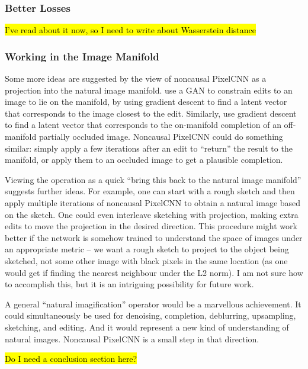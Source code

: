 \documentclass[10pt,a4paper]{article}
\newcommand{\nquote}[1]{``{#1}''}
\begin{document}
\subsubsection{Better Losses}

\hl{I've read about it now, so I need to write about Wasserstein distance}

\subsubsection{Working in the Image Manifold}

Some more ideas are suggested by the view of noncausal PixelCNN as a projection into the natural image manifold. \citet{manifoldmanipulation} use a GAN to constrain edits to an image to lie on the manifold, by using gradient descent to find a latent vector that corresponds to the image closest to the edit. Similarly, \citet{imageinpainting} use gradient descent to find a latent vector that corresponds to the on-manifold completion of an off-manifold partially occluded image. Noncausal PixelCNN could do something similar: simply apply a few iterations after an edit to \nquote{return} the result to the manifold, or apply them to an occluded image to get a plausible completion.

Viewing the operation as a quick \nquote{bring this back to the natural image manifold} suggests further ideas. For example, one can start with a rough sketch and then apply multiple iterations of noncausal PixelCNN to obtain a natural image based on the sketch. One could even interleave sketching with projection, making extra edits to move the projection in the desired direction. This procedure might work better if the network is somehow trained to understand the space of images under an appropriate metric -- we want a rough sketch to project to the object being sketched, not some other image with black pixels in the same location (as one would get if finding the nearest neighbour under the L2 norm). I am not sure how to accomplish this, but it is an intriguing possibility for future work.

A general \nquote{natural imagification} operator would be a marvellous achievement. It could simultaneously be used for denoising, completion, deblurring, upsampling, sketching, and editing. And it would represent a new kind of understanding of natural images. Noncausal PixelCNN is a small step in that direction.

\hl{Do I need a conclusion section here?}


\end{document}
